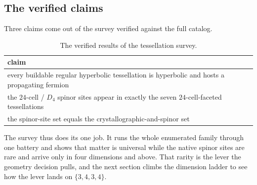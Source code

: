 \subsection{The verified claims}

Three claims come out of the survey verified against the full catalog.

\begin{table}[ht]
\centering
\begin{tabular}{@{}l@{}}
\toprule
claim \\
\midrule
every buildable regular hyperbolic tessellation is hyperbolic and hosts a propagating fermion \\
the $24$-cell / $D_4$ spinor sites appear in exactly the seven $24$-cell-faceted tessellations \\
the spinor-site set equals the crystallographic-and-spinor set \\
\bottomrule
\end{tabular}
\caption{The verified results of the tessellation survey.}
\label{tab:verified-claims}
\end{table}

The survey thus does its one job. It runs the whole enumerated family through one battery and shows that matter is universal while the native spinor sites are rare and arrive only in four dimensions and above. That rarity is the lever the geometry decision pulls, and the next section climbs the dimension ladder to see how the lever lands on $\{3,4,3,4\}$.
